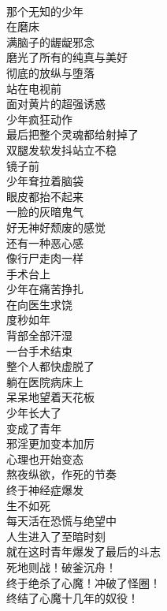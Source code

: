 \begin{poem}[崇高的灵魂]
    \begin{multicols}{3}
        \begin{center}~\\
            那个无知的少年 \\ 在磨床 \\ 满脑子的龌龊邪念 \\ 磨光了所有的纯真与美好 \\ 彻底的放纵与堕落 \\ 站在电视前 \\ 面对黄片的超强诱惑 \\ 少年疯狂动作 \\ 最后把整个灵魂都给射掉了 \\ 双腿发软发抖站立不稳 \\ 镜子前 \\ 少年耷拉着脑袋 \\ 眼皮都抬不起来 \\ 一脸的灰暗鬼气 \\ 好无神好颓废的感觉 \\ 还有一种恶心感 \\ 像行尸走肉一样 \\ 手术台上 \\ 少年在痛苦挣扎 \\ 在向医生求饶 \\ 度秒如年 \\ 背部全部汗湿 \\ 一台手术结束 \\ 整个人都快虚脱了 \\ 躺在医院病床上 \\ 呆呆地望着天花板 \\ 少年长大了 \\ 变成了青年 \\ 邪淫更加变本加厉 \\ 心理也开始变态 \\ 熬夜纵欲，作死的节奏 \\ 终于神经症爆发 \\ 生不如死 \\ 每天活在恐慌与绝望中 \\ 人生进入了至暗时刻 \\ 就在这时青年爆发了最后的斗志 \\ 死地则战！破釜沉舟！ \\ 终于绝杀了心魔！冲破了怪圈！ \\ 终结了心魔十几年的奴役！
\end{center}
\end{multicols}
\end{poem}
